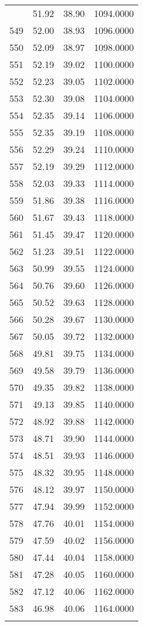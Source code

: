 \documentclass[
  captions=tableheading,
]{scrartcl}
\begin{document}
\begin{longtable} {l|l|l|l}
{548	& 51.92 &	38.90 &	1094.0000\\
549	& 52.00 &	38.93 &	1096.0000\\
550	& 52.09 &	38.97 &	1098.0000\\
551	& 52.19 &	39.02 &	1100.0000\\
552	& 52.23 &	39.05 &	1102.0000\\
553	& 52.30 &	39.08 &	1104.0000\\
554	& 52.35 &	39.14 &	1106.0000\\
555	& 52.35 &	39.19 &	1108.0000\\
556	& 52.29 &	39.24 &	1110.0000\\
557	& 52.19 &	39.29 &	1112.0000\\
558	& 52.03 &	39.33 &	1114.0000\\
559	& 51.86 &	39.38 &	1116.0000\\
560	& 51.67 &	39.43 &	1118.0000\\
561	& 51.45 &	39.47 &	1120.0000\\
562	& 51.23 &	39.51 &	1122.0000\\
563	& 50.99 &	39.55 &	1124.0000\\
564	& 50.76 &	39.60 &	1126.0000\\
565	& 50.52 &	39.63 &	1128.0000\\
566	& 50.28 &	39.67 &	1130.0000\\
567	& 50.05 &	39.72 &	1132.0000\\
568	& 49.81 &	39.75 &	1134.0000\\
569	& 49.58 &	39.79 &	1136.0000\\
570	& 49.35 &	39.82 &	1138.0000\\
571	& 49.13 &	39.85 &	1140.0000\\
572	& 48.92 &	39.88 &	1142.0000\\
573	& 48.71 &	39.90 &	1144.0000\\
574	& 48.51 &	39.93 &	1146.0000\\
575	& 48.32 &	39.95 &	1148.0000\\
576	& 48.12 &	39.97 &	1150.0000\\
577	& 47.94 &	39.99 &	1152.0000\\
578	& 47.76 &	40.01 &	1154.0000\\
579	& 47.59 &	40.02 &	1156.0000\\
580	& 47.44 &	40.04 &	1158.0000\\
581	& 47.28 &	40.05 &	1160.0000\\
582	& 47.12 &	40.06 &	1162.0000\\
583	& 46.98 &	40.06 &	1164.0000\\
}
\end{longtable}
\end{document}
